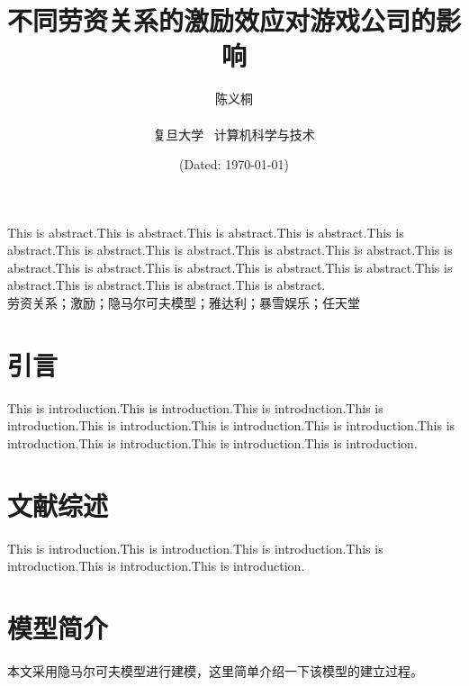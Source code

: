 \documentclass[hyperref]{ctexart}
\title{\textbf{不同劳资关系的激励效应对游戏公司的影响}}
\author{\sffamily 陈义桐 \\ \\复旦大学 \ 计算机科学与技术}
\date{(Dated: \today)}
\begin{document}
	\maketitle
		This is abstract.This is abstract.This is abstract.This is abstract.This is abstract.This is abstract.This is abstract.This is abstract.This is abstract.This is abstract.This is abstract.This is abstract.This is abstract.This is abstract.This is abstract.This is abstract.This is abstract.This is abstract.\\
		
		劳资关系；激励；隐马尔可夫模型；雅达利；暴雪娱乐；任天堂
	\begin{multicols}{2}
	\section{引言}
	This is introduction.This is introduction.This is introduction.This is introduction.This is introduction.This is introduction.This is introduction.This is introduction.This is introduction.This is introduction.This is introduction.
	\section{文献综述}
	This is introduction.This is introduction.This is introduction.This is introduction.This is introduction.This is introduction.
	\section{模型简介}
	本文采用隐马尔可夫模型进行建模，这里简单介绍一下该模型的建立过程。

\end{multicols}
\end{document}

